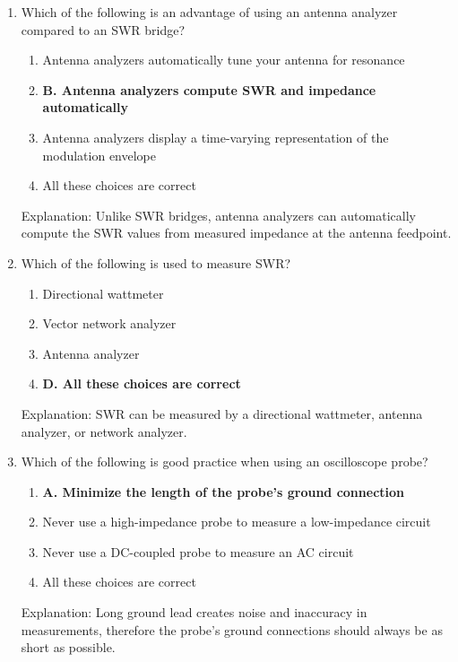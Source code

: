 \begin{enumerate}
    \item Which of the following is an advantage of using an antenna analyzer compared to an SWR bridge?
      \begin{enumerate}
          \item  Antenna analyzers automatically tune your antenna for resonance
       \item \textbf{B. Antenna analyzers compute SWR and impedance automatically}
      \item  Antenna analyzers display a time-varying representation of the modulation envelope
       \item  All these choices are correct
        \end{enumerate}
       \textcolor{myred}{Explanation:}
    Unlike SWR bridges, antenna analyzers can automatically compute the SWR values from measured impedance at the antenna feedpoint.
    
    \item Which of the following is used to measure SWR?
        \begin{enumerate}
       \item  Directional wattmeter
     \item  Vector network analyzer
        \item  Antenna analyzer
       \item \textbf{D. All these choices are correct}
        \end{enumerate}
          \textcolor{myred}{Explanation:}
        SWR can be measured by a directional wattmeter, antenna analyzer, or network analyzer.

   \item Which of the following is good practice when using an oscilloscope probe?
        \begin{enumerate}
        \item \textbf{A. Minimize the length of the probe's ground connection}
       \item  Never use a high-impedance probe to measure a low-impedance circuit
         \item  Never use a DC-coupled probe to measure an AC circuit
     \item  All these choices are correct
     \end{enumerate}
    \textcolor{myred}{Explanation:}
   Long ground lead creates noise and inaccuracy in measurements, therefore the probe's ground connections should always be as short as possible.


\end{enumerate}
